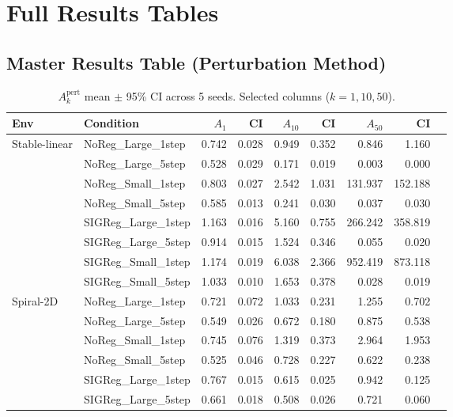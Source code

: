 \documentclass{article}
\begin{document}
\appendix

\section{Full Results Tables}
\label{app:tables}

\subsection{Master Results Table (Perturbation Method)}

\begin{table}[h]
\centering
\caption{$A_k^{\text{pert}}$ mean $\pm$ 95\% CI across 5 seeds. Selected columns ($k=1,10,50$).}
\small
\begin{tabular}{llrrrrrrr}
\toprule
Env & Condition & $A_1$ & CI & $A_{10}$ & CI & $A_{50}$ & CI \\
\midrule
\multirow{8}{*}{Stable-linear}
 & NoReg\_Large\_1step  & 0.742 & 0.028 & 0.949 & 0.352 & 0.846   & 1.160 \\
 & NoReg\_Large\_5step  & 0.528 & 0.029 & 0.171 & 0.019 & 0.003   & 0.000 \\
 & NoReg\_Small\_1step  & 0.803 & 0.027 & 2.542 & 1.031 & 131.937 & 152.188 \\
 & NoReg\_Small\_5step  & 0.585 & 0.013 & 0.241 & 0.030 & 0.037   & 0.030 \\
 & SIGReg\_Large\_1step & 1.163 & 0.016 & 5.160 & 0.755 & 266.242 & 358.819 \\
 & SIGReg\_Large\_5step & 0.914 & 0.015 & 1.524 & 0.346 & 0.055   & 0.020 \\
 & SIGReg\_Small\_1step & 1.174 & 0.019 & 6.038 & 2.366 & 952.419 & 873.118 \\
 & SIGReg\_Small\_5step & 1.033 & 0.010 & 1.653 & 0.378 & 0.028   & 0.019 \\
\midrule
\multirow{8}{*}{Spiral-2D}
 & NoReg\_Large\_1step  & 0.721 & 0.072 & 1.033 & 0.231 & 1.255   & 0.702 \\
 & NoReg\_Large\_5step  & 0.549 & 0.026 & 0.672 & 0.180 & 0.875   & 0.538 \\
 & NoReg\_Small\_1step  & 0.745 & 0.076 & 1.319 & 0.373 & 2.964   & 1.953 \\
 & NoReg\_Small\_5step  & 0.525 & 0.046 & 0.728 & 0.227 & 0.622   & 0.238 \\
 & SIGReg\_Large\_1step & 0.767 & 0.015 & 0.615 & 0.025 & 0.942   & 0.125 \\
 & SIGReg\_Large\_5step & 0.661 & 0.018 & 0.508 & 0.026 & 0.721   & 0.060 \\

\end{tabular}
\end{table}
\end{document}
